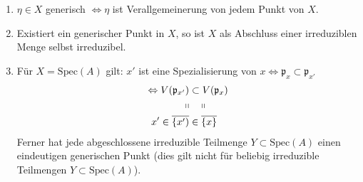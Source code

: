 \begin{rem}\mbox{}
  \begin{enumerate}
  \item $\eta\in X$ generisch $\Leftrightarrow\eta$ ist
    Verallgemeinerung von jedem Punkt von $X$.
  \item Existiert ein generischer Punkt in $X$, so ist $X$ als
    Abschluss einer irreduziblen Menge selbst irreduzibel.
  \item Für $X=\text{Spec}(A)$ gilt: $x'$ ist eine Spezialisierung von
    $x\Leftrightarrow\mathfrak{p}_{x}\subset\mathfrak{p}_{x'}$
    \begin{align*}
      \Leftrightarrow V(\mathfrak{p}_{x'}) & \subset V(\mathfrak{p}_{x})\\
      \shortparallel & \phantom{\subset\,}\shortparallel\\
      x'\in\overline{\{x')} & \in\overline{\{x\}}
    \end{align*}
    Ferner hat jede abgeschlossene irreduzible Teilmenge
    $Y\subset\text{Spec}(A)$ einen eindeutigen generischen Punkt (dies
    gilt nicht für beliebig irreduzible Teilmengen
    $Y\subset\text{Spec}(A)$).
  \end{enumerate}
\end{rem}
